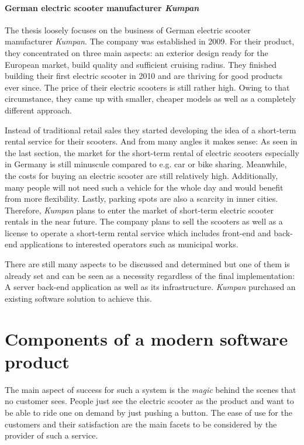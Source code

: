 \documentclass[12pt,a4paper,twoside]{report}
\begin{document}
\paragraph{German electric scooter manufacturer \textit{Kumpan}} \label{sect:kumpan}

The thesis loosely focuses on the business of German electric scooter manufacturer \textit{Kumpan}.
The company was established in 2009. For their product, they concentrated on three main aspects:
an exterior design ready for the European market, build quality and sufficient cruising radius.
They finished building their first electric scooter in 2010 and are thriving for good products ever since.
The price of their electric scooters is still rather high. Owing to that circumstance,
they came up with smaller, cheaper models as well as a completely different approach.

Instead of traditional retail sales they started developing the idea of a
short-term rental service for their scooters. And from many angles it makes sense:
As seen in the last section, the market for the short-term rental of electric scooters
especially in Germany is still minuscule compared to e.g. car or bike sharing.
Meanwhile, the costs for buying an electric scooter are still relatively high.
Additionally, many people will not need such a vehicle for the whole day and would benefit
from more flexibility. Lastly, parking spots are also a scarcity in inner cities.
Therefore, \textit{Kumpan} plans to enter the market of short-term electric scooter rentals
in the near future. The company plans to sell the scooters as well as a license
to operate a short-term rental service which includes front-end and back-end applications
to interested operators such as municipal works.

There are still many aspects to be discussed and determined but one of them
is already set and can be seen as a necessity regardless of the final implementation:
A server back-end application as well as its infrastructure.
\textit{Kumpan} purchased an existing software solution to achieve this.


\section{Components of a modern software product} \label{sect:frontend/backend}

The main aspect of success for such a system is the \textit{magic} behind the scenes
that no customer sees. People just see the electric scooter as the product and
want to be able to ride one on demand by just pushing a button.
The ease of use for the customers and their satisfaction are the main facets
to be considered by the provider of such a service.
\end{document}
